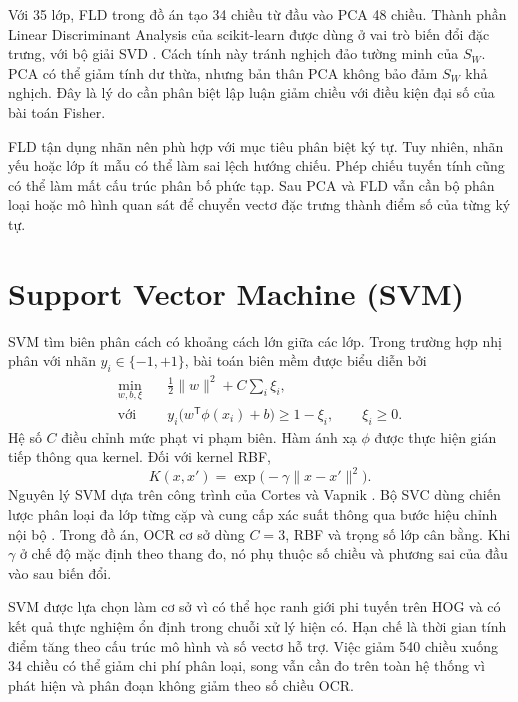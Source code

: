 Với 35 lớp, FLD trong đồ án tạo 34 chiều từ đầu vào PCA 48 chiều. Thành phần Linear Discriminant Analysis của scikit-learn được dùng ở vai trò biến đổi đặc trưng, với bộ giải SVD \cite{sklda}. Cách tính này tránh nghịch đảo tường minh của $S_W$. PCA có thể giảm tính dư thừa, nhưng bản thân PCA không bảo đảm $S_W$ khả nghịch. Đây là lý do cần phân biệt lập luận giảm chiều với điều kiện đại số của bài toán Fisher.

FLD tận dụng nhãn nên phù hợp với mục tiêu phân biệt ký tự. Tuy nhiên, nhãn yếu hoặc lớp ít mẫu có thể làm sai lệch hướng chiếu. Phép chiếu tuyến tính cũng có thể làm mất cấu trúc phân bố phức tạp. Sau PCA và FLD vẫn cần bộ phân loại hoặc mô hình quan sát để chuyển vectơ đặc trưng thành điểm số của từng ký tự.

\section{Support Vector Machine (SVM)}
SVM tìm biên phân cách có khoảng cách lớn giữa các lớp. Trong trường hợp nhị phân với nhãn $y_i\in\{-1,+1\}$, bài toán biên mềm được biểu diễn bởi
\begin{align}
\min_{w,b,\xi}\quad &\frac{1}{2}\lVert w\rVert^2+C\sum_i\xi_i,\\
\text{với}\quad &y_i\bigl(w^\mathsf{T}\phi(x_i)+b\bigr)\geq1-\xi_i,
\qquad \xi_i\geq0.
\end{align}
Hệ số $C$ điều chỉnh mức phạt vi phạm biên. Hàm ánh xạ $\phi$ được thực hiện gián tiếp thông qua kernel. Đối với kernel RBF,
\begin{equation}
K(x,x')=\exp\bigl(-\gamma\lVert x-x'\rVert^2\bigr).
\end{equation}
Nguyên lý SVM dựa trên công trình của Cortes và Vapnik \cite{svm}. Bộ SVC dùng chiến lược phân loại đa lớp từng cặp và cung cấp xác suất thông qua bước hiệu chỉnh nội bộ \cite{sksvm}. Trong đồ án, OCR cơ sở dùng $C=3$, RBF và trọng số lớp cân bằng. Khi $\gamma$ ở chế độ mặc định theo thang đo, nó phụ thuộc số chiều và phương sai của đầu vào sau biến đổi.

SVM được lựa chọn làm cơ sở vì có thể học ranh giới phi tuyến trên HOG và có kết quả thực nghiệm ổn định trong chuỗi xử lý hiện có. Hạn chế là thời gian tính điểm tăng theo cấu trúc mô hình và số vectơ hỗ trợ. Việc giảm 540 chiều xuống 34 chiều có thể giảm chi phí phân loại, song vẫn cần đo trên toàn hệ thống vì phát hiện và phân đoạn không giảm theo số chiều OCR.

